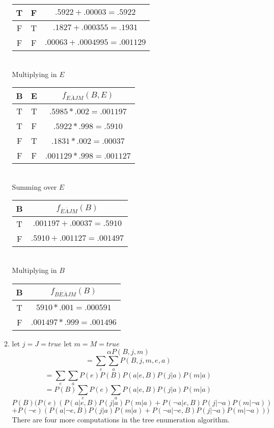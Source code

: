 \documentclass[12pt,a4paper]{report}
\begin{document}
\begin{enumerate}
\begin{enumerate}
\begin{tabular}{| c | c | c |}
T & F & $.5922 + .00003 = .5922$ \\ \hline
F & T & $.1827 + .000355 = .1931$ \\ \hline
F & F & $.00063 + .0004995 = .001129$ \\ \hline
\end{tabular}\\
Multiplying in $E$\\
\begin{tabular}{| c | c | c |}
\hline
B & E & $f_{E\overline{A}JM}(B, E)$ \\ \hline
T & T & $.5985 * .002 = .001197$ \\ \hline
T & F & $.5922 * .998 = .5910$ \\ \hline
F & T & $.1831 * .002 = .00037$ \\ \hline
F & F & $.001129 * .998 = .001127$ \\ \hline
\end{tabular}\\
Summing over $E$\\
\begin{tabular}{| c | c |}
  \hline
  B& $f_{\overline{E}\overline{A}JM}(B)$ \\ \hline
  T & $.001197 + .00037 = .5910$ \\ \hline
  F & $.5910 + .001127 = .001497$ \\ \hline
\end{tabular}\\
Multiplying in $B$\\
\begin{tabular}{| c | c |}
  \hline
  B& $f_{B\overline{E}\overline{A}JM}(B)$ \\ \hline
  T & $5910 * .001 = .000591$ \\ \hline
  F & $.001497 * .999 = .001496$ \\ \hline
\end{tabular}



\item let $j=J=true$ let $m=M=true$ \[\alpha P(B,j,m)\]
\[=\sum_e \sum_a P(B,j,m,e,a)\]
\[=\sum_e \sum_a P(e)P(B)P(a|e,B)P(j|a)P(m|a)\]
\[=P(B) \sum_e P(e) \sum_a P(a|e,B)P(j|a)P(m|a)\]
\[P(B)(P(e)(P(a|e,B)P(j|a)P(m|a)+P(\neg a | e,B)P(j| \neg a)P(m| \neg a))\] \[+ P(\neg e)(P(a| \neg e,B)P(j|a)P(m|a)+P(\neg a | \neg e,B)P(j| \neg a)P(m|\neg a)))\]
There are four more computations in the tree enumeration algorithm.


\end{enumerate}
\end{enumerate}
\end{document}
